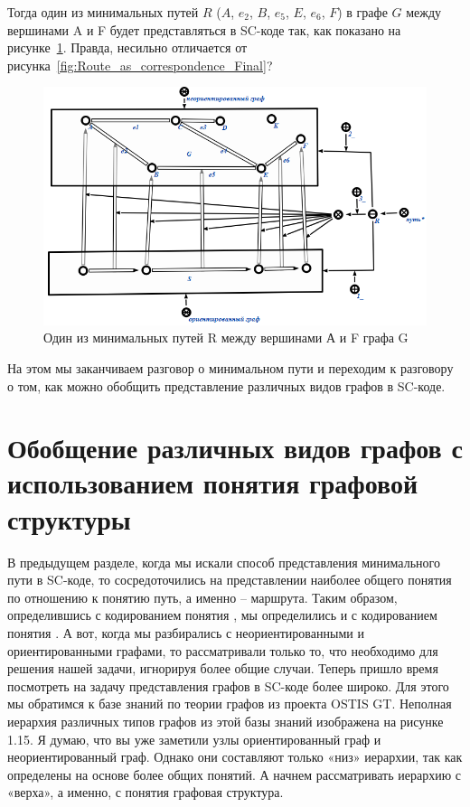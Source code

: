 Тогда один из минимальных путей $R$ ($A$, $e_2$, $B$, $e_5$, $E$,
$e_6$, $F$) в графе $G$ между вершинами A и F будет представляться в
SC-коде так, как показано на рисунке~\ref{fig:Path_Final}. Правда,
несильно отличается от
рисунка~\ref{fig:Route_as_correspondence_Final}?

\begin{figure}[h!]
  \centering
  \includegraphics[scale=0.6]{images/2/Path_Final}
  \caption{Один из минимальных путей R между вершинами А и F графа G}
  \label{fig:Path_Final}
\end{figure}
 
На этом мы заканчиваем разговор о минимальном пути и переходим к
разговору о том, как можно обобщить представление различных видов
графов в SC-коде.

\section{Обобщение различных видов графов с использованием понятия
  графовой структуры}

В предыдущем разделе, когда мы искали способ представления
минимального пути в SC-коде, то сосредоточились на представлении
наиболее общего понятия по отношению к понятию путь, а именно –
маршрута. Таким образом, определившись с кодированием понятия
, мы определились и с кодированием понятия . А
вот, когда мы разбирались с неориентированными и ориентированными
графами, то рассматривали только то, что необходимо для решения нашей
задачи, игнорируя более общие случаи. Теперь пришло время посмотреть
на задачу представления графов в SC-коде более широко. Для этого мы
обратимся к базе знаний по теории графов из проекта OSTIS GT. Неполная
иерархия различных типов графов из этой базы знаний изображена на
рисунке 1.15. Я думаю, что вы уже заметили узлы ориентированный граф и
неориентированный граф. Однако они составляют только «низ» иерархии,
так как определены на основе более общих понятий. А начнем
рассматривать иерархию с «верха», а именно, с понятия графовая
структура.

